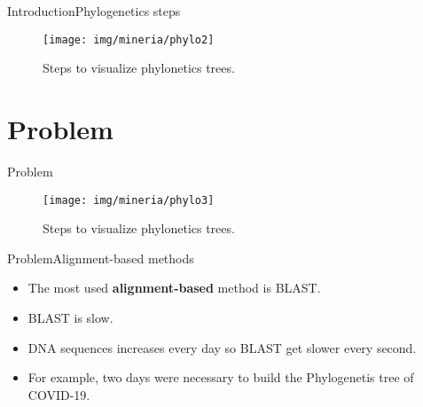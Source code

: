 \documentclass[10pt]{beamer}
\newcommand{\1}{
	\setbeamertemplate{background}{
		\texttt{[image: img/1\_dna]}
		\tikz[overlay] \fill[fill opacity=0.75,fill=white] (0,0) rectangle (-\paperwidth,\paperheight);
	}
}
\begin{document}
\begin{frame}{Introduction}{Phylogenetics steps}
	\begin{figure}[]
		\centering
		\texttt{[image: img/mineria/phylo2]}
		\label{img:mot2}
		\caption{Steps to visualize phylonetics trees.}
	\end{figure}
\end{frame}



\section{Problem}

\begin{frame}{Problem}
	\begin{figure}[]
		\centering
		\texttt{[image: img/mineria/phylo3]}
		\label{img:mot2}
		\caption{Steps to visualize phylonetics trees.}
	\end{figure}
\end{frame}


\begin{frame}{Problem}{Alignment-based methods}
	\begin{block}{}
		\begin{itemize}
			\item The most used \textbf{alignment-based} method is BLAST. \pause
			\item BLAST is slow. \pause
			\item DNA sequences increases every day so BLAST get slower every second. \pause		 	
			\item For example, two days were necessary to build the Phylogenetis tree of COVID-19. 
		\end{itemize}
	\end{block}
\end{frame}
\end{document}
